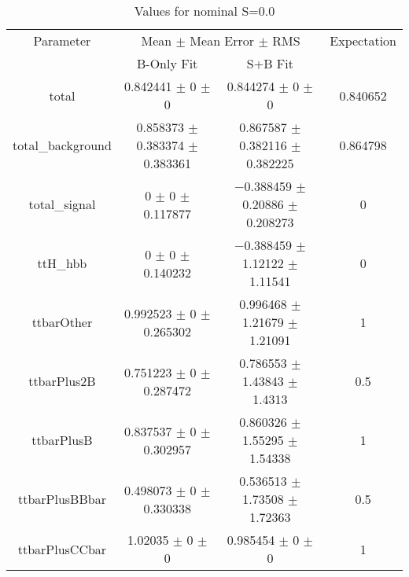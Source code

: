 \begin{table}
\centering
\caption{Values for nominal S=0.0}
\begin{tabular}{cccc}
\toprule
Parameter & \multicolumn{2}{c}{Mean $\pm$ Mean Error $\pm$ RMS} & Expectation\\
 & B-Only Fit & S+B Fit & \\
\midrule
total & \num{0.842441} $\pm$ \num{0} $\pm$ \num{0} & \num{0.844274} $\pm$ \num{0} $\pm$ \num{0} & \num{0.840652}\\
total\_background & \num{0.858373} $\pm$ \num{0.383374} $\pm$ \num{0.383361} & \num{0.867587} $\pm$ \num{0.382116} $\pm$ \num{0.382225} & \num{0.864798}\\
total\_signal & \num{0} $\pm$ \num{0} $\pm$ \num{0.117877} & \num{-0.388459} $\pm$ \num{0.20886} $\pm$ \num{0.208273} & \num{0}\\
ttH\_hbb & \num{0} $\pm$ \num{0} $\pm$ \num{0.140232} & \num{-0.388459} $\pm$ \num{1.12122} $\pm$ \num{1.11541} & \num{0}\\
ttbarOther & \num{0.992523} $\pm$ \num{0} $\pm$ \num{0.265302} & \num{0.996468} $\pm$ \num{1.21679} $\pm$ \num{1.21091} & \num{1}\\
ttbarPlus2B & \num{0.751223} $\pm$ \num{0} $\pm$ \num{0.287472} & \num{0.786553} $\pm$ \num{1.43843} $\pm$ \num{1.4313} & \num{0.5}\\
ttbarPlusB & \num{0.837537} $\pm$ \num{0} $\pm$ \num{0.302957} & \num{0.860326} $\pm$ \num{1.55295} $\pm$ \num{1.54338} & \num{1}\\
ttbarPlusBBbar & \num{0.498073} $\pm$ \num{0} $\pm$ \num{0.330338} & \num{0.536513} $\pm$ \num{1.73508} $\pm$ \num{1.72363} & \num{0.5}\\
ttbarPlusCCbar & \num{1.02035} $\pm$ \num{0} $\pm$ \num{0} & \num{0.985454} $\pm$ \num{0} $\pm$ \num{0} & \num{1}\\
\bottomrule
\end{tabular}
\end{table}